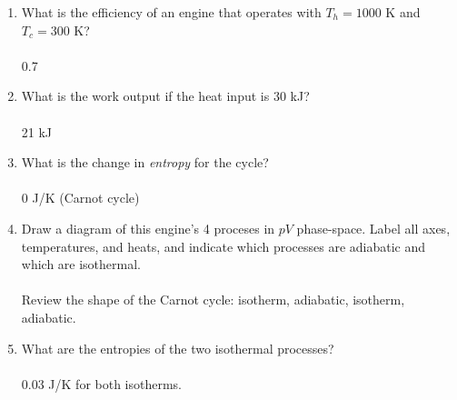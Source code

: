 \documentclass[10pt]{article}
\begin{document}
\begin{enumerate}
\begin{enumerate}
\item What is the efficiency of an engine that operates with $T_h = 1000$ K and $T_c = 300$ K? \\ \\ 0.7 \\
\item What is the work output if the heat input is 30 kJ? \\ \\ 21 kJ \\
\item What is the change in \textit{entropy} for the cycle? \\ \\ 0 J/K (Carnot cycle) \\
\item Draw a diagram of this engine's 4 proceses in $pV$ phase-space.  Label all axes, temperatures, and heats, and indicate which processes are adiabatic and which are isothermal. \\ \\ Review the shape of the Carnot cycle: isotherm, adiabatic, isotherm, adiabatic.
\item What are the entropies of the two isothermal processes? \\ \\ 0.03 J/K for both isotherms. \\
\end{enumerate}
\end{enumerate}
\end{document}
